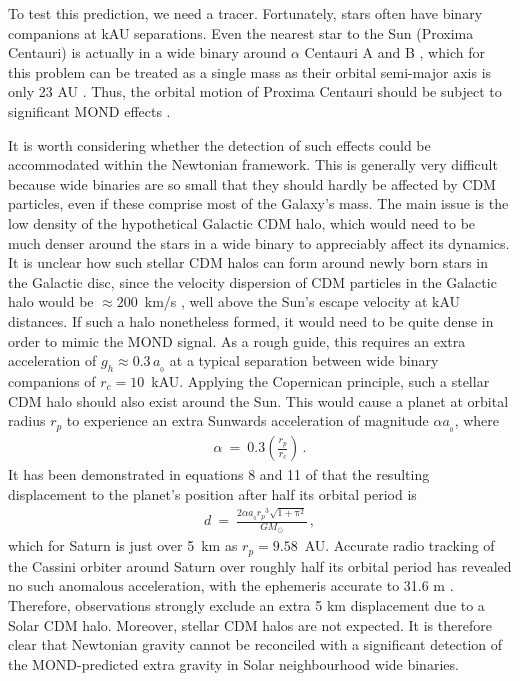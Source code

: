 \documentclass[fleqn,usenatbib,useAMS]{mnras} %
\begin{document}
To test this prediction, we need a tracer. Fortunately, stars often have binary companions at kAU separations. Even the nearest star to the Sun (Proxima Centauri) is actually in a wide binary around $\alpha$ Centauri A and B \citep{Kervella_2017}, which for this problem can be treated as a single mass as their orbital semi-major axis is only 23 AU \citep{Kervella_2016}. Thus, the orbital motion of Proxima Centauri should be subject to significant MOND effects \citep{Beech_2009, Beech_2011}.

It is worth considering whether the detection of such effects could be accommodated within the Newtonian framework. This is generally very difficult because wide binaries are so small that they should hardly be affected by CDM particles, even if these comprise most of the Galaxy's mass. The main issue is the low density of the hypothetical Galactic CDM halo, which would need to be much denser around the stars in a wide binary to appreciably affect its dynamics. It is unclear how such stellar CDM halos can form around newly born stars in the Galactic disc, since the velocity dispersion of CDM particles in the Galactic halo would be $\approx 200$~km/s \citep[e.g.][]{Bozorgnia_2017}, well above the Sun's escape velocity at kAU distances. If such a halo nonetheless formed, it would need to be quite dense in order to mimic the MOND signal. As a rough guide, this requires an extra acceleration of $g_h \approx 0.3 \, a_{_0}$ at a typical separation between wide binary companions of $r_c = 10$~kAU. Applying the Copernican principle, such a stellar CDM halo should also exist around the Sun. This would cause a planet at orbital radius $r_p$ to experience an extra Sunwards acceleration of magnitude $\alpha a_{_0}$, where
\begin{eqnarray}
	\alpha ~=~ 0.3 \left( \frac{r_p}{r_c} \right) \, .
\end{eqnarray}
It has been demonstrated in equations 8 and 11 of \citet{Banik_2020_dipole} that the resulting displacement to the planet's position after half its orbital period is
\begin{eqnarray}
	d ~=~ \frac{2\alpha a_{_0}{r_p}^3 \sqrt{1 + {\mathrm{\pi}}^2}}{GM_\odot} \, ,
\end{eqnarray}
which for Saturn is just over 5~km as $r_p = 9.58$~AU. Accurate radio tracking of the Cassini orbiter around Saturn over roughly half its orbital period has revealed no such anomalous acceleration, with the ephemeris accurate to 31.6 m \citep[table~11 of][]{Viswanathan_2017}. Therefore, observations strongly exclude an extra 5 km displacement due to a Solar CDM halo. Moreover, stellar CDM halos are not expected. It is therefore clear that Newtonian gravity cannot be reconciled with a significant detection of the MOND-predicted extra gravity in Solar neighbourhood wide binaries.
\end{document}
